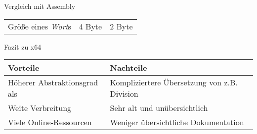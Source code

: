 \begin{frame}{Vergleich mit \riscv{} Assembly}
\begin{tabular}{l|l|l}
		Größe eines \emph{Wort}s   & 4 Byte                                                                                                                                                           & 2 Byte                                                                                                                                                                                                                                                                   \\
	\end{tabular}
\end{frame}

\begin{frame}{Fazit zu x64}

	\begin{table}[h]
		\begin{tabular}{p{6cm}|p{6cm}}
			\cellcolor{green!20} Vorteile         & \cellcolor{red!20} Nachteile                 \\
			\hline
			Höherer Abstraktionsgrad als \riscv{} & Kompliziertere Übersetzung von z.B. Division \\
			Weite Verbreitung                     & Sehr alt und unübersichtlich                 \\
			Viele Online-Ressourcen               & Weniger übersichtliche Dokumentation         \\
		\end{tabular}
	\end{table}
\end{frame}

